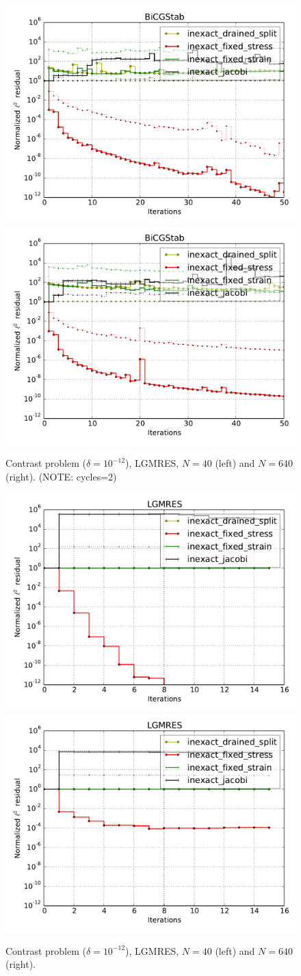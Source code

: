 \documentclass{article}
\begin{document}
\begin{figure}
\begin{center}
\includegraphics[width=0.49\linewidth]{../BiCGStab,problem=12,exact=0,N=40,cycles=2.pdf}
\includegraphics[width=0.49\linewidth]{../BiCGStab,problem=12,exact=0,N=640,cycles=2.pdf}
\caption{Contrast problem ($\delta=10^{-12}$), LGMRES, $N=40$ (left) and $N=640$ (right). (NOTE: cycles=2)}
\label{contrast12-bicgstab}
\end{center}
\end{figure}

\begin{figure}
\begin{center}
\includegraphics[width=0.49\linewidth]{../LGMRES,problem=12,exact=0,N=40,cycles=1.pdf}
\includegraphics[width=0.49\linewidth]{../LGMRES,problem=12,exact=0,N=640,cycles=1.pdf}
\caption{Contrast problem ($\delta=10^{-12}$), LGMRES, $N=40$ (left) and $N=640$ (right).}
\label{contrast12-lgmres}
\end{center}
\end{figure}
\end{document}
